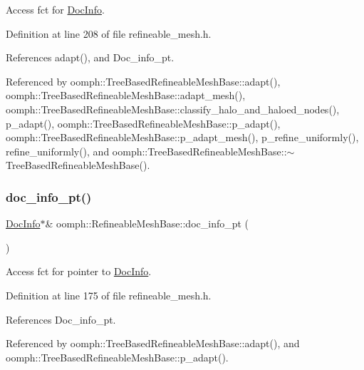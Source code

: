 Access fct for \hyperlink{classoomph_1_1DocInfo}{Doc\+Info}. 



Definition at line 208 of file refineable\+\_\+mesh.\+h.



References adapt(), and Doc\+\_\+info\+\_\+pt.



Referenced by oomph\+::\+Tree\+Based\+Refineable\+Mesh\+Base\+::adapt(), oomph\+::\+Tree\+Based\+Refineable\+Mesh\+Base\+::adapt\+\_\+mesh(), oomph\+::\+Tree\+Based\+Refineable\+Mesh\+Base\+::classify\+\_\+halo\+\_\+and\+\_\+haloed\+\_\+nodes(), p\+\_\+adapt(), oomph\+::\+Tree\+Based\+Refineable\+Mesh\+Base\+::p\+\_\+adapt(), oomph\+::\+Tree\+Based\+Refineable\+Mesh\+Base\+::p\+\_\+adapt\+\_\+mesh(), p\+\_\+refine\+\_\+uniformly(), refine\+\_\+uniformly(), and oomph\+::\+Tree\+Based\+Refineable\+Mesh\+Base\+::$\sim$\+Tree\+Based\+Refineable\+Mesh\+Base().

\mbox{\label{classoomph_1_1RefineableMeshBase_a706216900b53bc7d9214e1f982e69309}} 
\subsubsection{\texorpdfstring{doc\+\_\+info\+\_\+pt()}{doc\_info\_pt()}}
{\footnotesize\ttfamily \hyperlink{classoomph_1_1DocInfo}{Doc\+Info}$\ast$\& oomph\+::\+Refineable\+Mesh\+Base\+::doc\+\_\+info\+\_\+pt (\begin{DoxyParamCaption}{ }\end{DoxyParamCaption})\hspace{0.3cm}{\ttfamily [inline]}}



Access fct for pointer to \hyperlink{classoomph_1_1DocInfo}{Doc\+Info}. 



Definition at line 175 of file refineable\+\_\+mesh.\+h.



References Doc\+\_\+info\+\_\+pt.



Referenced by oomph\+::\+Tree\+Based\+Refineable\+Mesh\+Base\+::adapt(), and oomph\+::\+Tree\+Based\+Refineable\+Mesh\+Base\+::p\+\_\+adapt().

